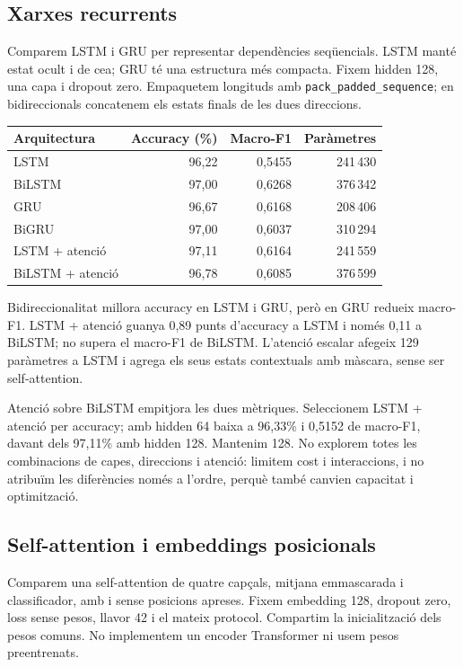 \documentclass[11pt,a4paper]{article}
\begin{document}
\subsection{Xarxes recurrents}
Comparem LSTM i GRU per representar dependències seqüencials. LSTM manté estat ocult i de ce\lgem{}a; GRU té una estructura més compacta. Fixem hidden 128, una capa i dropout zero. Empaquetem longituds amb \texttt{pack\_padded\_sequence}; en bidireccionals concatenem els estats finals de les dues direccions.

\begin{center}
\small
\begin{tabular}{lrrr}
\toprule
Arquitectura & Accuracy (\%) & Macro-F1 & Paràmetres\\
\midrule
LSTM & 96,22 & 0,5455 & 241\,430 \\
BiLSTM & 97,00 & 0,6268 & 376\,342 \\
GRU & 96,67 & 0,6168 & 208\,406 \\
BiGRU & 97,00 & 0,6037 & 310\,294 \\
LSTM + atenció & 97,11 & 0,6164 & 241\,559 \\
BiLSTM + atenció & 96,78 & 0,6085 & 376\,599 \\
\bottomrule
\end{tabular}
\end{center}

Bidireccionalitat millora accuracy en LSTM i GRU, però en GRU redueix macro-F1. LSTM + atenció guanya 0,89 punts d'accuracy a LSTM i només 0,11 a BiLSTM; no supera el macro-F1 de BiLSTM. L'atenció escalar afegeix 129 paràmetres a LSTM i agrega els seus estats contextuals amb màscara, sense ser self-attention.

Atenció sobre BiLSTM empitjora les dues mètriques. Seleccionem LSTM + atenció per accuracy; amb hidden 64 baixa a 96,33\% i 0,5152 de macro-F1, davant dels 97,11\% amb hidden 128. Mantenim 128. No explorem totes les combinacions de capes, direccions i atenció: limitem cost i interaccions, i no atribuïm les diferències només a l'ordre, perquè també canvien capacitat i optimització.

\newpage
\subsection{Self-attention i embeddings posicionals}
Comparem una self-attention de quatre capçals, mitjana emmascarada i classificador, amb i sense posicions apreses. Fixem embedding 128, dropout zero, loss sense pesos, llavor 42 i el mateix protocol. Compartim la inicialització dels pesos comuns. No implementem un encoder Transformer ni usem pesos preentrenats.
\end{document}
